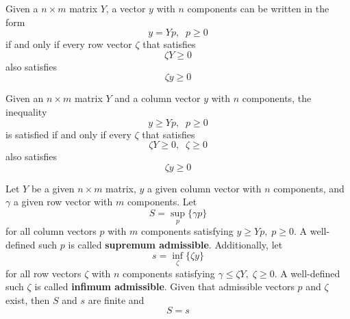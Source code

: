   \begin{corollary}
  Given a $n \times m$ matrix $Y$, a vector $y$ with $n$ components can be written in the form 
  \begin{equation}
    y = Y p, \;\; p \geq 0
  \end{equation}
  if and only if every row vector $\zeta$ that satisfies 
  \begin{equation}
    \zeta Y \geq 0
  \end{equation}
  also satisfies 
  \begin{equation}
    \zeta y \geq 0
  \end{equation}
  \end{corollary}

  \begin{theorem}
  Given an $n \times m$ matrix $Y$ and a column vector $y$ with $n$ components, the inequality 
  \begin{equation}
    y \geq Y p, \;\; p \geq 0
  \end{equation}
  is satisfied if and only if every $\zeta$ that satisfies
  \begin{equation}
    \zeta Y \geq 0, \;\; \zeta \geq 0
  \end{equation}
  also satisfies 
  \begin{equation}
    \zeta y \geq 0
  \end{equation}
  \end{theorem}

  \begin{theorem}
  Let $Y$ be a given $n \times m$ matrix, $y$ a given column vector with $n$ components, and $\gamma$ a given row vector with $m$ components. Let 
  \begin{equation}
    S = \sup_p \{\gamma p\}
  \end{equation}
  for all column vectors $p$ with $m$ components satisfying $y \geq Y p, \; p \geq 0$. A well-defined such $p$ is called \textbf{supremum admissible}. Additionally, let 
  \begin{equation}
    s = \inf_\zeta \{ \zeta y\}
  \end{equation}
  for all row vectors $\zeta$ with $n$ components satisfying $\gamma \leq \zeta Y, \; \zeta \geq 0$. A well-defined such $\zeta$ is called \textbf{infimum admissible}. Given that admissible vectors $p$ and $\zeta$ exist, then $S$ and $s$ are finite and 
  \begin{equation}
    S = s
  \end{equation}
  \end{theorem}


